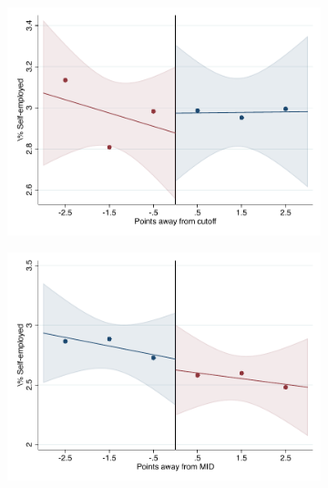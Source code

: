 \documentclass[oneside,11pt]{article}
\begin{document}
\begin{figure}[H]

    \ContinuedFloat
    \caption{(Cont.) RD plots for outcome variables across those assigned to IPN high-school, and those who are not\label{fig:ITT_rd_plot_IPN_6}}
    \begin{center}
    
    \begin{subfigure}{0.475\textwidth}
        \centering
        \includegraphics[width=\textwidth]{04_Figures/rd_plot_tau_Selfemployed_IPN3.pdf}
    \end{subfigure}
    \begin{subfigure}{0.475\textwidth}
        \centering
        \includegraphics[width=\textwidth]{04_Figures/rd_plot_mid_Selfemployed_IPN3.pdf}
    \end{subfigure}
    \end{center}
    

\end{figure}
\end{document}
